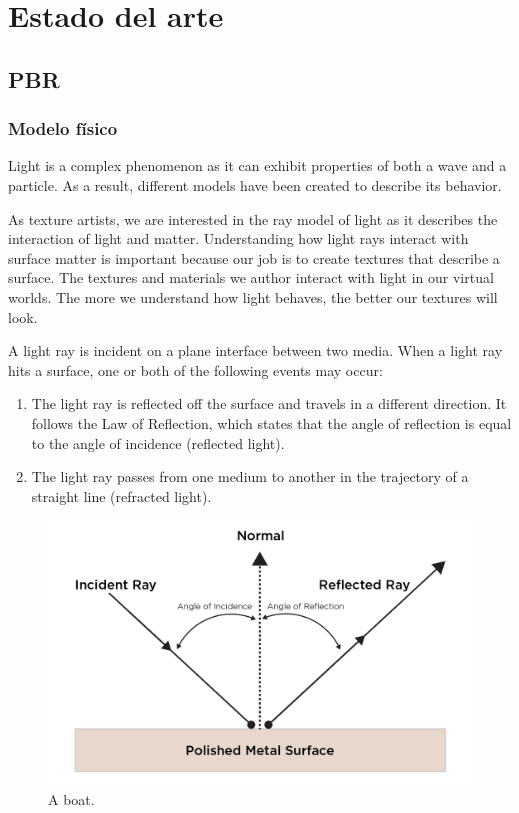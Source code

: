 \chapter{Estado del arte}

\section{PBR}
    \subsection{Modelo f\'isico}
        Light is a complex phenomenon as it can exhibit properties of both a wave and a
        particle. As a result, different models have been created to describe its behavior.

        As texture artists, we are interested in the ray model of light as it describes the
        interaction of light and matter. Understanding how light rays interact with surface
        matter is important because our job is to create textures that describe a surface.
        The textures and materials we author interact with light in our virtual worlds. The
        more we understand how light behaves, the better our textures will look.
        
        A light ray is incident on a plane interface between two media. When a light ray
        hits a surface, one or both of the following events may occur:
        
        \begin{enumerate}
            \item
                The light ray is reflected off the surface and travels in a different direction.
                It follows the Law of Reflection, which states that the angle of reflection is equal
                to the angle of incidence (reflected light).
            \item
                The light ray passes from one medium to another in the trajectory of a straight
                line (refracted light).
        \end{enumerate}
    
        \begin{figure}[H]
            \setlength{\fboxsep}{0pt}
            \includegraphics[width=1\linewidth]{images/substance-the_pbr_guide-incident_rays.png}
            \caption{A boat.}
            \singlespacing
        \end{figure}
        

